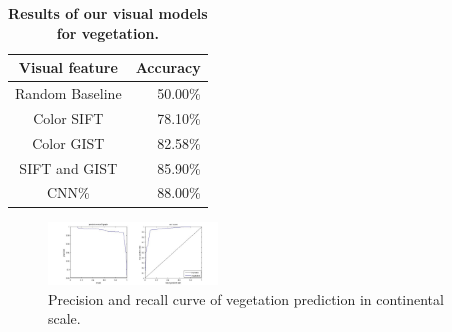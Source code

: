 
\begin{table}[th!]
\centering
\caption {\textbf{Results of our visual models for vegetation.}}
\label{tab:veg_img_classifier} 
\tiny
\begin{tabular}{@{}cr@{}}\toprule
Visual feature &  Accuracy\\\midrule
Random Baseline & 50.00\%\\
Color SIFT & 78.10\%\\
Color GIST & 82.58\% \\
SIFT and GIST& 85.90\% \\
CNN\% &  88.00\%\\
\bottomrule
\end{tabular}
\vspace{-12pt}
\end{table}

\begin{figure}[th!]
\begin{center}
\includegraphics[width=0.4\textwidth]{figure/curvevege.jpg}
\end{center}
\vspace{-20pt}
\caption{Precision and recall curve of vegetation prediction in continental scale.}
\label{fig:curvevege}
\vspace{-12pt}
\end{figure}


